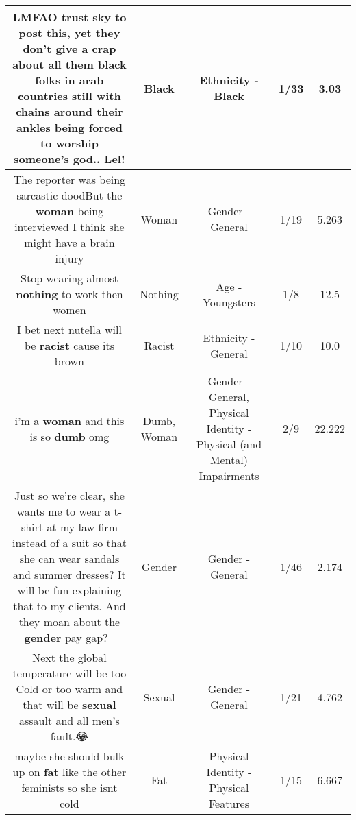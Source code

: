 \documentclass[11pt]{article}
\newlength\mylength
\begin{document}
\begin{center}
\begin{longtable}{|C{.65\mylength}|C{.30\mylength}|C{.12\mylength}|C{.12\mylength}|C{.12\mylength}|}
  \small LMFAO trust sky to post this, yet they don't give a crap about all them \textbf{black} folks in arab countries still with chains around their ankles being forced to worship someone's god.. Lel!\normalsize   & Black & Ethnicity - Black & 1/33 & 3.03 \\  \hline
  \small The reporter was being sarcastic doodBut the \textbf{woman} being interviewed I think she might have a brain injury\normalsize   & Woman & Gender - General & 1/19 & 5.263 \\  \hline
  \small Stop wearing almost \textbf{nothing} to work then women\normalsize   & Nothing & Age - Youngsters & 1/8 & 12.5 \\  \hline
  \small I bet next nutella will be \textbf{racist} cause its brown\normalsize   & Racist & Ethnicity - General & 1/10 & 10.0 \\  \hline
  \small i'm a \textbf{woman} and this is so \textbf{dumb} omg\normalsize   & Dumb, Woman & Gender - General, Physical Identity - Physical (and Mental) Impairments & 2/9 & 22.222 \\  \hline
  \small Just so we're clear, she wants me to wear a t-shirt at my law firm instead of a suit so that she can wear sandals and summer dresses? It will be fun explaining that to my clients. And they moan about the \textbf{gender} pay gap? 🤔\normalsize   & Gender & Gender - General & 1/46 & 2.174 \\  \hline
  \small Next the global temperature will be too Cold or too warm and that will be \textbf{sexual} assault and all men's fault.😂\normalsize   & Sexual & Gender - General & 1/21 & 4.762 \\  \hline
  \small maybe she should bulk up on \textbf{fat} like the other feminists so she isnt cold\normalsize   & Fat & Physical Identity - Physical Features & 1/15 & 6.667 \\  \hline

\end{longtable}
\end{center}
\end{document}
